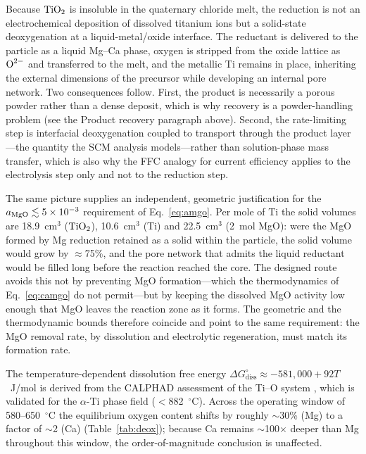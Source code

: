 \documentclass[11pt]{article}
\begin{document}
Because $\ce{TiO2}$ is insoluble in the quaternary chloride melt, the reduction is not an electrochemical deposition of dissolved titanium ions but a solid-state deoxygenation at a liquid-metal/oxide interface. The reductant is delivered to the particle as a liquid Mg--Ca phase, oxygen is stripped from the oxide lattice as $\ce{O^{2-}}$ and transferred to the melt, and the metallic Ti remains in place, inheriting the external dimensions of the precursor while developing an internal pore network. Two consequences follow. First, the product is necessarily a porous powder rather than a dense deposit, which is why recovery is a powder-handling problem (see the Product recovery paragraph above). Second, the rate-limiting step is interfacial deoxygenation coupled to transport through the product layer---the quantity the SCM analysis models---rather than solution-phase mass transfer, which is also why the FFC analogy for current efficiency applies to the electrolysis step only and not to the reduction step.

The same picture supplies an independent, geometric justification for the $a_{\ce{MgO}} \lesssim 5\times10^{-3}$ requirement of Eq.~\ref{eq:amgo}. Per mole of Ti the solid volumes are 18.9~cm$^3$ ($\ce{TiO2}$), 10.6~cm$^3$ (Ti) and 22.5~cm$^3$ (2~mol MgO): were the MgO formed by Mg reduction retained as a solid within the particle, the solid volume would grow by $\approx$75\%, and the pore network that admits the liquid reductant would be filled long before the reaction reached the core. The designed route avoids this not by preventing MgO formation---which the thermodynamics of Eq.~\ref{eq:camgo} do not permit---but by keeping the dissolved MgO activity low enough that MgO leaves the reaction zone as it forms. The geometric and the thermodynamic bounds therefore coincide and point to the same requirement: the MgO removal rate, by dissolution and electrolytic regeneration, must match its formation rate.

The temperature-dependent dissolution free energy $\Delta G^{\circ}_{\mathrm{diss}} \approx -581{,}000 + 92T$~J/mol is derived from the CALPHAD assessment of the Ti--O system \cite{waldner1999}, which is validated for the $\alpha$-Ti phase field ($<$882~$^{\circ}$C). Across the operating window of 580--650~$^{\circ}$C the equilibrium oxygen content shifts by roughly $\sim$30\% (Mg) to a factor of $\sim$2 (Ca) (Table~\ref{tab:deox}); because Ca remains $\sim$100$\times$ deeper than Mg throughout this window, the order-of-magnitude conclusion is unaffected.
\end{document}
